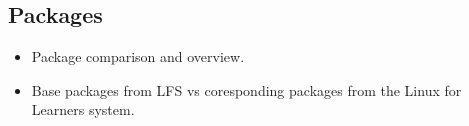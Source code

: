\subsection{Packages}\label{Packages}

\begin{itemize}
    \item Package comparison and overview.
    \item Base packages from LFS vs coresponding packages from the Linux for Learners system.
\end{itemize}

